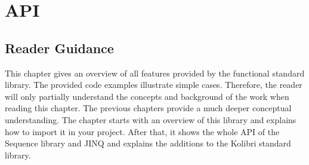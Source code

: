 \chapter{API} %
\label{chap:api}

\section*{Reader Guidance} %
\label{sec:api_reader_guidance}
This chapter gives an overview of all features provided by the functional
standard library. The provided code examples illustrate simple cases.
Therefore, the reader will only partially understand the concepts and
background of the work when reading this chapter. The previous chapters provide
a much deeper conceptual understanding.
The chapter starts with an overview of this library and explains how to import
it in your project. After that, it shows the whole API of the Sequence library
and JINQ and explains the additions to the Kolibri standard library.







